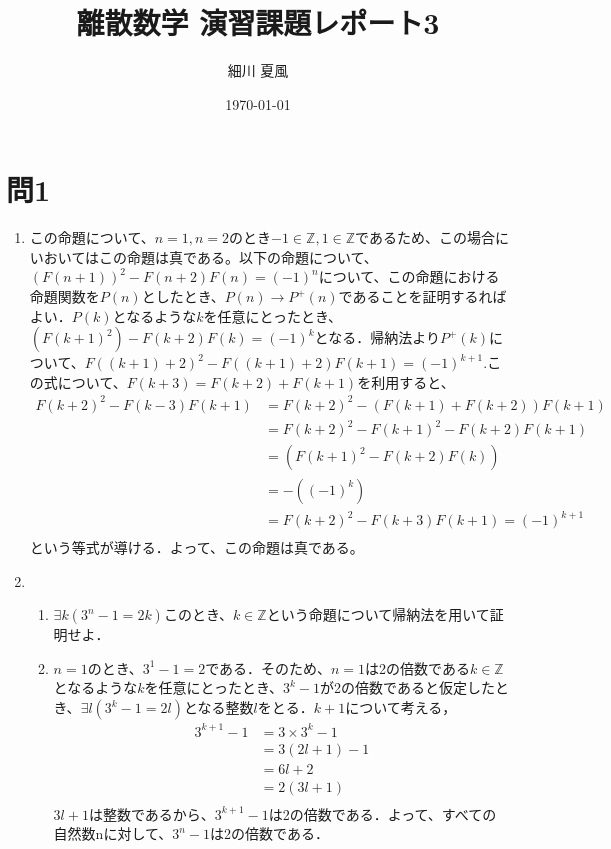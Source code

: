 \documentclass[uplatex]{jsarticle}
\title{離散数学 演習課題レポート3}
\author{細川 夏風}
\date{\today}
\begin{document}
\maketitle

\section{問1}
\renewcommand{\theenumi}{(\arabic{enumi})}
\begin{enumerate}
	\item 
		この命題について、$n = 1 , n = 2$のとき$-1 \in \mathbb{Z}, 1 \in \mathbb{Z}$であるため、この場合にいおいてはこの命題は真である。以下の命題について、$( F( n + 1 )) ^ 2 - F( n + 2 )F(n) = (-1)^n $について、この命題における命題関数を$P(n)$としたとき、$P(n) \rightarrow P^+(n)$であることを証明するればよい．$P(k)$となるような$k$を任意にとったとき、$(F(k + 1)^2 ) - F(k + 2)F(k) = (-1)^k$となる．帰納法より$P^+(k)$について、$F((k + 1) + 2 ) ^2 - F((k + 1) + 2)F(k + 1) = (-1)^{k+1}.$この式について、$F(k + 3) = F(k + 2)+F(k + 1)$を利用すると、
		\begin{equation}
			\begin{split}
				F(k+2)^2 - F(k-3)F(k+1) &= F(k+2)^2 - (F(k+1) + F(k+2))F(k+1) \\
				&=F(k+2)^2 - F(k+1)^2 - F(k+2)F(k+1)\\
				&=(F(k+1)^2 - F(k+2)F(k)) \\
				&= -((-1)^k)\\
				&=F(k+2)^2 - F(k+3)F(k+1) = (-1)^{k+1} \\
			\end{split}
		\end{equation}
		という等式が導ける．よって、この命題は真である。
	\item 
		\begin{enumerate}
			\item $\exists k ( 3^n-1 = 2k)$このとき、$k \in \mathbb{Z}$という命題について帰納法を用いて証明せよ．
			\item $n = 1$のとき、$3^1 - 1 = 2$である．そのため、$n = 1$は2の倍数である$k \in \mathbb{Z}$となるような$k$を任意にとったとき、$3^k - 1$が2の倍数であると仮定したとき、$\exists l(3^k - 1 = 2l)$となる整数$l$をとる．$k + 1$について考える，
				\begin{equation}
					\begin{split}
						3^{k+1} - 1  &= 3 \times 3^{k} - 1\\
						&= 3(2l + 1) - 1\\
						&= 6l + 2\\
						&= 2(3l + 1)\\
					\end{split}
				\end{equation}
			$3l + 1$は整数であるから、$3^{k+1} - 1$は2の倍数である．よって、すべての自然数nに対して、$3^n -1$は2の倍数である．
		\end{enumerate}
		
	\end{enumerate}
\end{document}
